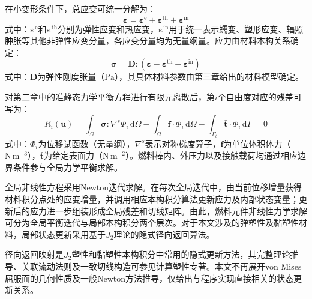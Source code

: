 在小变形条件下，总应变可统一分解为：
\begin{equation}
	\boldsymbol{\varepsilon}
	=
	\boldsymbol{\varepsilon}^{\mathrm{e}}
	+
	\boldsymbol{\varepsilon}^{\mathrm{th}}
	+
	\boldsymbol{\varepsilon}^{\mathrm{in}}
	\label{eq:ch4_strain_decomposition}
\end{equation}
\noindent 式中：$\boldsymbol{\varepsilon}^{\mathrm{e}}$和$\boldsymbol{\varepsilon}^{\mathrm{th}}$分别为弹性应变和热应变，$\boldsymbol{\varepsilon}^{\mathrm{in}}$用于统一表示蠕变、塑形应变、辐照肿胀等其他非弹性应变分量，各应变分量均为无量纲量。应力由材料本构关系确定：
\begin{equation}
	\boldsymbol{\sigma}
	=
	\mathbf{D}:
	\left(
	\boldsymbol{\varepsilon}
	-\boldsymbol{\varepsilon}^{\mathrm{th}}
	-\boldsymbol{\varepsilon}^{\mathrm{in}}
	\right)
	\label{eq:ch4_constitutive_relation}
\end{equation}
\noindent 式中：$\mathbf{D}$为弹性刚度张量（$\mathrm{Pa}$），其具体材料参数由第三章给出的材料模型确定。

对第二章中的准静态力学平衡方程进行有限元离散后，第$i$个自由度对应的残差可写为：
\begin{equation}
	R_i(\mathbf{u})
	=
	\int_{\Omega}
	\boldsymbol{\sigma}:\nabla^{s}\boldsymbol{\varPhi}_i
	\,\mathrm{d}\Omega
	-
	\int_{\Omega}
	\mathbf{f}\cdot\boldsymbol{\varPhi}_i
	\,\mathrm{d}\Omega
	-
	\int_{\Gamma_t}
	\bar{\mathbf{t}}\cdot\boldsymbol{\varPhi}_i
	\,\mathrm{d}\Gamma
	=0
	\label{eq:ch4_mechanical_residual}
\end{equation}
\noindent 式中：$\boldsymbol{\varPhi}_i$为位移试函数（无量纲），$\nabla^{s}$表示对称梯度算子，$\mathbf{f}$为单位体积体力（$\mathrm{N\,m^{-3}}$），$\bar{\mathbf{t}}$为给定表面力（$\mathrm{N\,m^{-2}}$）。燃料棒内、外压力以及接触载荷均通过相应边界条件参与全局力学平衡求解。

全局非线性方程采用Newton迭代求解。在每次全局迭代中，由当前位移增量获得材料积分点处的应变增量，并调用相应本构积分算法更新应力及内部状态变量；更新后的应力进一步组装形成全局残差和切线矩阵。由此，燃料元件非线性力学求解可分为全局平衡迭代与局部本构积分两个层次。对于本文涉及的弹塑性及黏塑性材料，局部状态更新采用基于$J_2$理论的隐式径向返回算法。


径向返回映射是$J_2$塑性和黏塑性本构积分中常用的隐式更新方法，其完整理论推导、关联流动法则及一致切线构造可参见计算塑性专著\cite{dunneIntroductionComputationalPlasticity2005}。本文不再展开von Mises屈服面的几何性质及一般Newton方法推导，仅给出与程序实现直接相关的状态更新关系。

